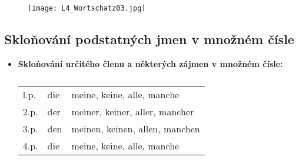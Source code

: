     \begin{figure}[ht!]
      \centering
      \texttt{[image: L4\_Wortschatz03.jpg]}
      \caption*{ }
      \label{NJ:fig_L4_Wortschatz03}
    \end{figure}
    
    \subsection*{Skloňování podstatných jmen v množném čísle}
      \begin{itemize} %
        \item \textbf{Skloňování určitého členu a některých zájmen v množném čísle:}
              \begin{table}[ht!]   %
                \hspace*{5em}
                \begin{tabular}{l|ll}
                  \hline
                  l.p. & die & meine, keine, alle, manche     \\
                  2.p. & der & meiner, keiner, aller, mancher \\
                  3.p. & den & meinen, keinen, allen, manchen \\
                  4.p. & die & meine, keine, alle, manche     \\
                  \hline
                \end{tabular}
                \caption*{ }
              \end{table}
              

\end{itemize}
